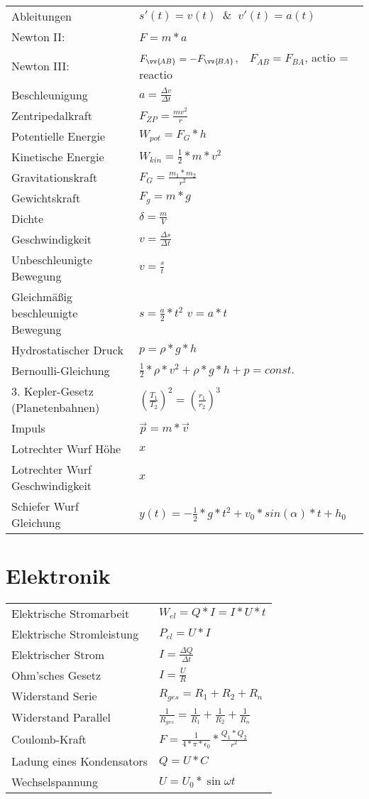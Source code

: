 \documentclass[11pt,a4paper]{paper}
\begin{document}
\begin{tabularx}{\textwidth}{X|X}
	Ableitungen & $s'(t) = v(t) \;\;\&\;\; v'(t) = a(t)$\\
	Newton II: & $F=m*a$\\
	Newton III: & ${F}_{\vv{\!AB}}=-{F}_{\vv{\!BA}}$,$\quad F_{AB} = F_{BA}$, actio = reactio \\
	Beschleunigung & $a=\frac{\Delta v}{\Delta t}$\\
	Zentripedalkraft & $F_{ZP}=\frac{mv^2}{r}$\\
	Potentielle Energie & $W_{pot} = F_G * h$\\
	Kinetische Energie & $W_{kin} = \frac{1}{2}*m*v^2$ \\
	Gravitationskraft & $F_G = \frac{m_1 * m_2 }{r^2}$\\
	Gewichtskraft & $F_g = m * g$\\
	Dichte & $\delta = \frac{m}{V}$\\
	Geschwindigkeit & $v = \frac{\Delta s}{\Delta t}$\\
	Unbeschleunigte Bewegung & $ v = \frac{s}{t}$\\
	Gleichmäßig beschleunigte Bewegung & $s = \frac{a}{2}*t^2$ \hspace{.5cm} $v = a * t $\\
	Hydrostatischer Druck & $p = \rho * g * h$ \\
	Bernoulli-Gleichung & $\frac{1}{2}*\rho*v^2 + \rho * g * h + p = const.$\\
	3. Kepler-Gesetz (Planetenbahnen) & $ (\frac{T_1}{T_2})^2 = (\frac{r_1}{r_2})^3$\\
	Impuls & $\vec{p} = m * \vec{v}$\\
	Lotrechter Wurf Höhe & $x$\\
	Lotrechter Wurf Geschwindigkeit & $x$\\
	Schiefer Wurf Gleichung & $y(t) = -\frac{1}{2}*g*t^2 + v_0*sin(\alpha)*t + h_0$\\
\end{tabularx}
\section{Elektronik}
\begin{tabularx}{\textwidth}{X|X}
	Elektrische Stromarbeit & $ W_{el} = Q * I = I * U * t$\\
	Elektrische Stromleistung & $P_{el} = U * I$\\
	Elektrischer Strom & $I = \frac{\Delta Q}{\Delta t}$\\
	Ohm'sches Gesetz & $I=\frac{U}{R}$\\
	Widerstand Serie & $R_{ges} = R_1 + R_2 + R_n$\\
	Widerstand Parallel & $\frac{1}{R_{ges}} = \frac{1}{R_1} + \frac{1}{R_2} + \frac{1}{R_n}$\\
	Coulomb-Kraft & $F = \frac{1}{4*\pi * \epsilon_{0}} * \frac{Q_1 * Q_2}{r^2}$\\
	Ladung eines Kondensators & $Q = U * C$\\
	Wechselspannung & $U = U_0 * \sin{\omega t}$\\
\end{tabularx}
\end{document}
